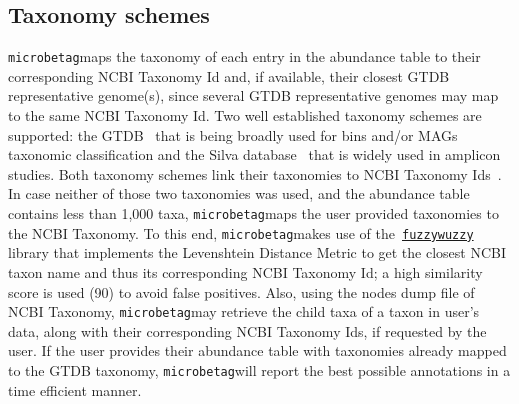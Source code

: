 \documentclass[sn-mathphys,Numbered]{sn-jnl}  %
\theoremstyle{thmstyleone}%
\theoremstyle{thmstyletwo}%
\theoremstyle{thmstylethree}%
\newcommand{\microbetag}{\texttt{microbetag}}
\begin{document}
    \subsection*{Taxonomy schemes}
    \label{subsec:taxonomies}

        \microbetag maps the taxonomy of each entry in the abundance table to their corresponding NCBI Taxonomy Id and, if available, their closest GTDB representative genome(s), since several GTDB representative genomes may map to the same NCBI Taxonomy Id.
        Two well established taxonomy schemes are supported: the GTDB~\cite{parks2022gtdb} that is being broadly used for bins and/or MAGs taxonomic classification and the Silva database~\cite{quast2012silva} that is widely used in amplicon studies. Both taxonomy schemes link their taxonomies to NCBI Taxonomy Ids~\cite{schoch2020ncbi}.
        In case neither of those two taxonomies was used, and the abundance table contains less than 1,000 taxa, \microbetag maps the user provided taxonomies to the NCBI Taxonomy. 
        To this end, \microbetag makes use of the~\href{https://github.com/seatgeek/thefuzz}{\texttt{fuzzywuzzy}} library that implements the Levenshtein Distance Metric to get the closest NCBI taxon name and thus its corresponding NCBI Taxonomy Id; a high similarity score is used (90) to avoid false positives. 
        Also, using the nodes dump file of NCBI Taxonomy, \microbetag may retrieve the child taxa of a taxon in user's data, along with their corresponding NCBI Taxonomy Ids, if requested by the user.
        If the user provides their abundance table with taxonomies already mapped to the GTDB taxonomy, \microbetag will report the best possible annotations in a time efficient manner. 
        
        
        
\end{document}
